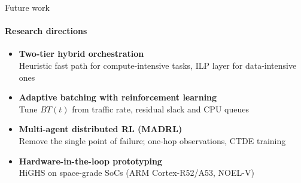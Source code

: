 \documentclass{beamer}
\newcommand{\bt}{\mathit{BT}}
\begin{document}
\begin{frame}{Future work}
\framesubtitle{Research directions}
\begin{itemize}\setlength\itemsep{6pt}
  \item \textbf{Two-tier hybrid orchestration}\\
  {\footnotesize Heuristic fast path for compute-intensive tasks, ILP layer for data-intensive ones}
  \item \textbf{Adaptive batching with reinforcement learning}\\
  {\footnotesize Tune $\bt(t)$ from traffic rate, residual slack and CPU queues}
  \item \textbf{Multi-agent distributed RL (MADRL)}\\
  {\footnotesize Remove the single point of failure; one-hop observations, CTDE training}
  \item \textbf{Hardware-in-the-loop prototyping}\\
  {\footnotesize HiGHS on space-grade SoCs (ARM Cortex-R52/A53, NOEL-V)}
\end{itemize}
\end{frame}

\backmatter
\end{document}

